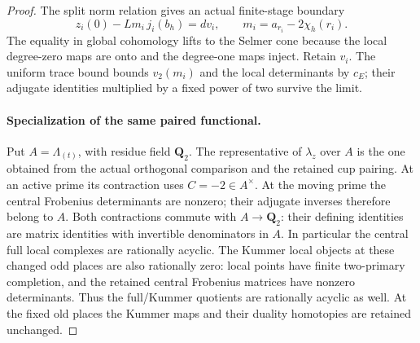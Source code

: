 \documentclass[11pt]{article}
\theoremstyle{definition}
\theoremstyle{remark}
\begin{document}
\begin{proof}\leavevmode
The split norm relation gives an actual finite-stage boundary
\[
 z_i(0)-Lm_i\,j_i(b_h)=dv_i,\qquad
 m_i=a_{r_i}-2\chi_h(r_i).                                      \tag{4.5}
\]
The equality in global cohomology lifts to the Selmer cone because
the local degree-zero maps are onto and the degree-one maps inject.
Retain $v_i$. The uniform trace bound bounds $v_2(m_i)$ and the local
determinants by $c_E$; their adjugate identities multiplied by a fixed
power of two survive the limit.

\paragraph{Specialization of the same paired functional.}
Put $A=\Lambda_{(t)}$, with residue field $\mathbf Q_2$.
The representative of $\lambda_z$ over $A$ is the one obtained from
the actual orthogonal comparison and the retained cup pairing.
At an active prime its contraction uses $C=-2\in A^\times$.
At the moving prime the central Frobenius determinants are nonzero;
their adjugate inverses therefore belong to $A$. Both contractions
commute with $A\to\mathbf Q_2$: their defining identities are matrix
identities with invertible denominators in $A$. In particular the
central full local complexes are rationally acyclic. The Kummer local
objects at these changed odd places are also rationally zero:
local points have finite two-primary completion, and the retained
central Frobenius matrices have nonzero determinants. Thus the
full/Kummer quotients are rationally acyclic as well. At the fixed old
places the Kummer maps and their duality homotopies are retained unchanged.


\end{proof}
\end{document}
